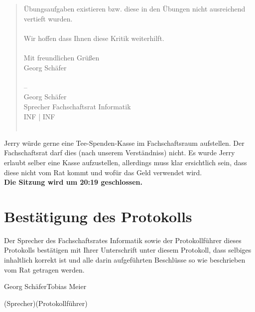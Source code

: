 \documentclass[a4paper, 11pt]{article} %
\newcommand{\TeXer}{Tobias Meier}
\newcommand{\fsiPresident}{Georg Schäfer}
\begin{document}
\begin{quote}
Übungsaufgaben existieren bzw. diese in den Übungen nicht ausreichend \\
vertieft wurden. \\
\\
Wir hoffen dass Ihnen diese Kritik weiterhilft. \\
\\
Mit freundlichen Grüßen \\
Georg Schäfer \\
\\
-- \\ 
Georg Schäfer \\
Sprecher Fachschaftsrat Informatik \\
INF | INF \\
\\
\end{quote}
Jerry würde gerne eine Tee-Spenden-Kasse im Fachschaftsraum aufstellen. Der Fachschaftsrat darf dies (nach unserem Verständniss) nicht. Es wurde Jerry erlaubt selber eine Kasse aufzustellen, allerdings muss klar ersichtlich sein, dass diese nicht vom Rat kommt und wofür das Geld verwendet wird. \\

\textbf{Die Sitzung wird um 20:19 geschlossen.} \\

\pagebreak
\section{Bestätigung des Protokolls}
Der Sprecher des Fachschaftsrates Informatik sowie der Protokollführer dieses Protokolls bestätigen mit Ihrer Unterschrift unter diesem Protokoll, dass selbiges inhaltlich korrekt ist und alle darin aufgeführten Beschlüsse so wie beschrieben vom Rat getragen werden.
\\

\vspace{3.5cm}
\hrulefill \hfill \hrulefill

\fsiPresident \hfill \TeXer

{\footnotesize (Sprecher)\hfill (Protokollführer)}
\end{document}
